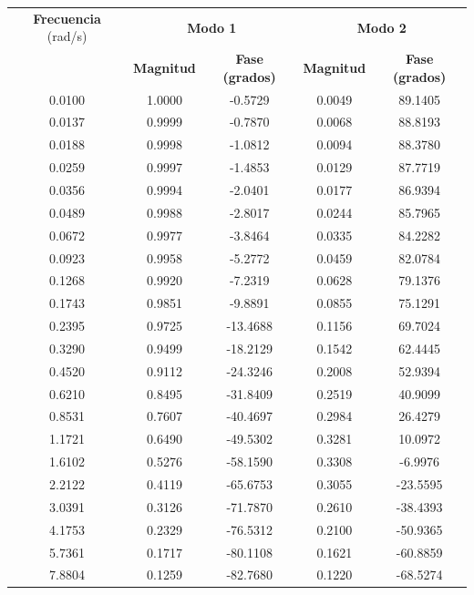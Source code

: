 \documentclass[
  11pt,
  letterpaper,
   addpoints,
   answers
  ]{exam}
\begin{document}
\begin{questions}
    \begin{table}[H]
        \centering
        \footnotesize
        \begin{tabular}{|c|c|c|c|c|}
        \hline
        \textbf{Frecuencia} (rad/s) & \multicolumn{2}{c|}{\textbf{Modo 1}} & \multicolumn{2}{c|}{\textbf{Modo 2}} \\
        \cline{2-5}
        & \textbf{Magnitud} & \textbf{Fase (grados)} & \textbf{Magnitud} & \textbf{Fase (grados)} \\
        \hline
        0.0100 & 1.0000 & -0.5729 & 0.0049 & 89.1405 \\
        0.0137 & 0.9999 & -0.7870 & 0.0068 & 88.8193 \\
        0.0188 & 0.9998 & -1.0812 & 0.0094 & 88.3780 \\
        0.0259 & 0.9997 & -1.4853 & 0.0129 & 87.7719 \\
        0.0356 & 0.9994 & -2.0401 & 0.0177 & 86.9394 \\
        0.0489 & 0.9988 & -2.8017 & 0.0244 & 85.7965 \\
        0.0672 & 0.9977 & -3.8464 & 0.0335 & 84.2282 \\
        0.0923 & 0.9958 & -5.2772 & 0.0459 & 82.0784 \\
        0.1268 & 0.9920 & -7.2319 & 0.0628 & 79.1376 \\
        0.1743 & 0.9851 & -9.8891 & 0.0855 & 75.1291 \\
        0.2395 & 0.9725 & -13.4688 & 0.1156 & 69.7024 \\
        0.3290 & 0.9499 & -18.2129 & 0.1542 & 62.4445 \\
        0.4520 & 0.9112 & -24.3246 & 0.2008 & 52.9394 \\
        0.6210 & 0.8495 & -31.8409 & 0.2519 & 40.9099 \\
        0.8531 & 0.7607 & -40.4697 & 0.2984 & 26.4279 \\
        1.1721 & 0.6490 & -49.5302 & 0.3281 & 10.0972 \\
        1.6102 & 0.5276 & -58.1590 & 0.3308 & -6.9976 \\
        2.2122 & 0.4119 & -65.6753 & 0.3055 & -23.5595 \\
        3.0391 & 0.3126 & -71.7870 & 0.2610 & -38.4393 \\
        4.1753 & 0.2329 & -76.5312 & 0.2100 & -50.9365 \\
        5.7361 & 0.1717 & -80.1108 & 0.1621 & -60.8859 \\
        7.8804 & 0.1259 & -82.7680 & 0.1220 & -68.5274 \\

\end{tabular}
\end{table}
\end{questions}
\end{document}
